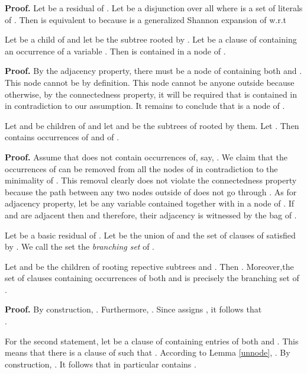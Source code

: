 \documentclass{llncs}
\begin{document}
{\bf Proof.}
Let  be a residual of .
Let  be a disjunction over all  where  is a set
of literals of . Then  is equivalent to  because 
is a generalized Shannon expansion of  w.r.t  



\begin{lemma} \label{unnode}
Let  be a child of  and let  be the subtree rooted by .
Let  be a clause of  containing an occurrence of a variable .
Then  is contained in a node of .
\end{lemma}

{\bf Proof.}
By the adjacency property, there must be a node  of  containing both  and .
This node cannot be  by definition. This node cannot be anyone outside  because
otherwise, by the connectedness property, it will be required that  is contained in
 in contradiction to our assumption. It remains to conclude that  is a node
of . 

\begin{lemma} \label{unclause}
Let  and  be  children of  and let  and  be the
subtrees of  rooted by them. Let .
Then  contains occurrences of  and
of .
\end{lemma}

{\bf Proof.}
Assume that  does not contain occurrences of, say, .
We claim that the occurrences of  can be removed from all the nodes of 
in contradiction to the minimality of . This removal clearly does not
violate the connectedness property because the path between any two nodes outside
of  does not go through . As for adjacency property, let  be any variable
contained together with  in a node of . 
If  and  are adjacent then  and therefore,
their adjacency is witnessed by the bag of . 

Let  be a basic residual of .
Let  be the union of  and the set of clauses of  satisfied 
by . We call the set  the \emph{branching set}
of .

\begin{lemma} \label{t1t2}
Let  and  be the children of  rooting repective subtrees  and .
Then . Moreover,the set of clauses
containing occurrences of both  and 
is precisely the branching set of . 
\end{lemma}

{\bf Proof.}
By construction, . Furthermore, .
Since  assigns , it follows that\\ .

For the second statement, let  be a clause of  containing entries of both
 and . This means that there is a clause  of 
such that . According to Lemma \ref{unnode}, .
By construction, . It follows that  in particular contains
. 
\end{document}
